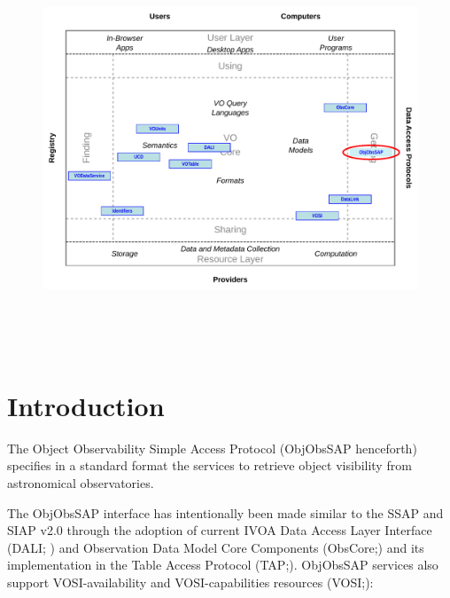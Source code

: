 \documentclass[11pt,a4paper]{ivoatex/ivoa}
\begin{document}

\begin{figure}[H]
\advance\leftskip 0.0in
\includegraphics[width=6.0in,height=4.73in]{./role_diagram.pdf}
\end{figure}


\pagebreak



\section{Introduction}\label{section:_Toc415497365}


The Object Observability Simple Access Protocol (ObjObsSAP henceforth)
specifies in a standard format the services to retrieve object
visibility from astronomical observatories.



The ObjObsSAP interface has intentionally been made similar to the SSAP
\citep{2012ivoa.spec.0210T} and SIAP v2.0 \citep{2015ivoa.spec.0617D} through the adoption
of current IVOA Data Access Layer Interface (DALI; \citealt{2017ivoa.spec.0517D}) and Observation Data
Model Core Components (ObsCore;\citealt{2017ivoa.spec.0509L}) and its implementation in
the Table Access Protocol (TAP;\citealt{2019ivoa.spec.0927D}). ObjObsSAP services also support
VOSI-availability and VOSI-capabilities resources (VOSI;\citealt{2017ivoa.spec.0524G}):
\end{document}
